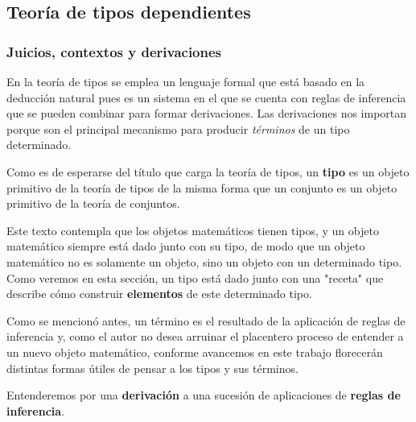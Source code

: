 \documentclass{article}
\begin{document}
\subsection{Teoría de tipos dependientes}
    \subsubsection{Juicios, contextos y derivaciones}
        En la teoría de tipos se emplea un lenguaje formal que está basado en la 
        deducción natural pues es un sistema en el que se cuenta con reglas de 
        inferencia que se pueden combinar para formar derivaciones. Las 
        derivaciones nos importan porque son el principal mecanismo para 
        producir \textit{términos} de un tipo determinado.
        
        Como es de esperarse del título que carga la teoría de tipos, un 
        \textbf{tipo} es un objeto primitivo de la teoría de tipos de la misma 
        forma que un conjunto es un objeto primitivo de la teoría de conjuntos. 
        
        Este texto contempla que los objetos matemáticos tienen tipos, y un
        objeto matemático siempre está dado junto con su tipo, de modo que
        un objeto matemático no es solamente un objeto, sino un objeto con un
        determinado tipo. Como veremos en esta sección, un tipo está dado junto
        con una "receta" que describe cómo construir \textbf{elementos} de
        este determinado tipo.
        
        Como se mencionó antes, un término es el resultado de la aplicación de 
        reglas de inferencia y, como el autor no desea arruinar el placentero 
        proceso de entender a un nuevo objeto matemático, conforme avancemos en 
        este trabajo florecerán distintas formas útiles de pensar a los tipos y 
        sus términos.

        Entenderemos por una \textbf{derivación} a una sucesión de aplicaciones 
        de \textbf{reglas de inferencia}.
\end{document}
